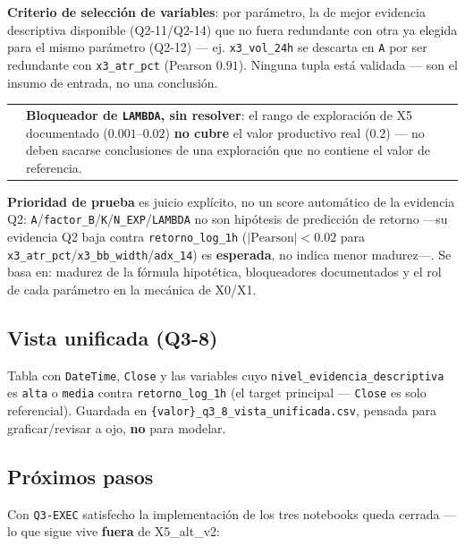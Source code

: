 \documentclass[11pt,a4paper]{article}
\makeatletter
\newcommand{\code}[1]{\texttt{\small #1}}
\newenvironment{advertencia}{%
  \par\medskip\noindent
  \begin{tabular}{@{}p{0.4em}@{\hspace{8pt}}p{\dimexpr\linewidth-2em\relax}@{}}
  \textcolor{crojo}{\rule{3pt}{1.1em}} &
}{\end{tabular}\par\medskip}
\makeatother
\begin{document}
\textbf{Criterio de selección de variables}: por parámetro, la de mejor evidencia
descriptiva disponible (Q2-11/Q2-14) que no fuera redundante con otra ya elegida para el
mismo parámetro (Q2-12) — ej. \code{x3\_vol\_24h} se descarta en \code{A} por ser
redundante con \code{x3\_atr\_pct} (Pearson \(0.91\)). Ninguna tupla está validada — son el
insumo de entrada, no una conclusión.

\begin{advertencia}
\textbf{Bloqueador de \code{LAMBDA}, sin resolver}: el rango de exploración de X5
documentado (\(0.001\)–\(0.02\)) \textbf{no cubre} el valor productivo real (\(0.2\)) —
no deben sacarse conclusiones de una exploración que no contiene el valor de referencia.
\end{advertencia}

\textbf{Prioridad de prueba} es juicio explícito, no un score automático de la evidencia
Q2: \code{A}/\code{factor\_B}/\code{K}/\code{N\_EXP}/\code{LAMBDA} no son hipótesis de
predicción de retorno —su evidencia Q2 baja contra \code{retorno\_log\_1h}
(\(|\text{Pearson}|<0.02\) para \code{x3\_atr\_pct}/\code{x3\_bb\_width}/\code{adx\_14})
es \textbf{esperada}, no indica menor madurez—. Se basa en: madurez de la fórmula
hipotética, bloqueadores documentados y el rol de cada parámetro en la mecánica de X0/X1.

\subsection{Vista unificada (Q3-8)}

Tabla con \code{DateTime}, \code{Close} y las variables cuyo
\code{nivel\_evidencia\_descriptiva} es \code{alta} o \code{media} contra
\code{retorno\_log\_1h} (el target principal — \code{Close} es solo referencial).
Guardada en \code{\{valor\}\_q3\_8\_vista\_unificada.csv}, pensada para graficar/revisar a
ojo, \textbf{no} para modelar.

\subsection{Próximos pasos}
\label{ssec:proximos-pasos}

Con \code{Q3-EXEC} satisfecho la implementación de los tres notebooks queda cerrada — lo
que sigue vive \textbf{fuera} de X5\_alt\_v2:
\end{document}
